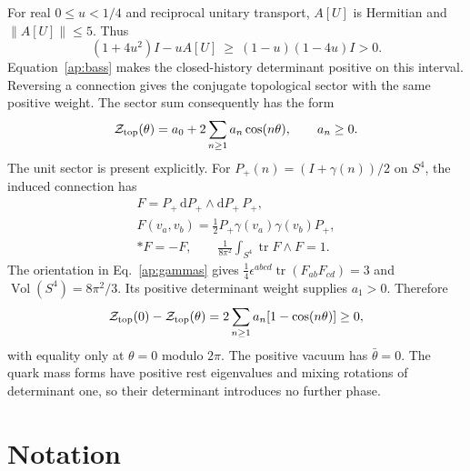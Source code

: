 \documentclass[aps,prx,reprint,longbibliography]{revtex4-2}
\providecommand{\tr}{\operatorname{tr}}
\providecommand{\dd}{\mathrm d}
\begin{document}
For real $0\leq u<1/4$ and reciprocal unitary transport, $A[U]$ is Hermitian and $\|A[U]\|\leq5$. Thus
\begin{equation}
 (1+4u^2)I-uA[U]\ \geq\ (1-u)(1-4u)I>0.
 \label{ap:positive-kernel}
\end{equation}
Equation~\eqref{ap:bass} makes the closed-history determinant positive on this interval. Reversing a connection gives the conjugate topological sector with the same positive weight. The sector sum consequently has the form
\begin{equation}
 \mathcal Z_{\rm top}(\theta)=a_0+2\sum_{n\geq1}a_n\cos(n\theta),\qquad a_n\geq0.
 \label{ap:theta-sectors}
\end{equation}
The unit sector is present explicitly. For $P_+(n)=(I+\gamma(n))/2$ on $S^4$, the induced connection has
\begin{equation}
\begin{gathered}
 F=P_+\,\dd P_+\wedge\dd P_+\,P_+,\\
 F(v_a,v_b)=\tfrac12P_+\gamma(v_a)\gamma(v_b)P_+,\\
 *F=-F,\qquad
 \frac1{8\pi^2}\int_{S^4}\tr F\wedge F=1.
 \end{gathered}
 \label{ap:unit-instanton}
\end{equation}
The orientation in Eq.~\eqref{ap:gammas} gives $\tfrac14\epsilon^{abcd}\tr(F_{ab}F_{cd})=3$ and $\operatorname{Vol}(S^4)=8\pi^2/3$. Its positive determinant weight supplies $a_1>0$. Therefore
\begin{equation}
 \mathcal Z_{\rm top}(0)-\mathcal Z_{\rm top}(\theta)
 =2\sum_{n\geq1}a_n[1-\cos(n\theta)]\geq0,
 \label{ap:theta-max}
\end{equation}
with equality only at $\theta=0$ modulo $2\pi$. The positive vacuum has $\bar\theta=0$. The quark mass forms have positive rest eigenvalues and mixing rotations of determinant one, so their determinant introduces no further phase.

\section{Notation}
\label{app:notation}
\end{document}
